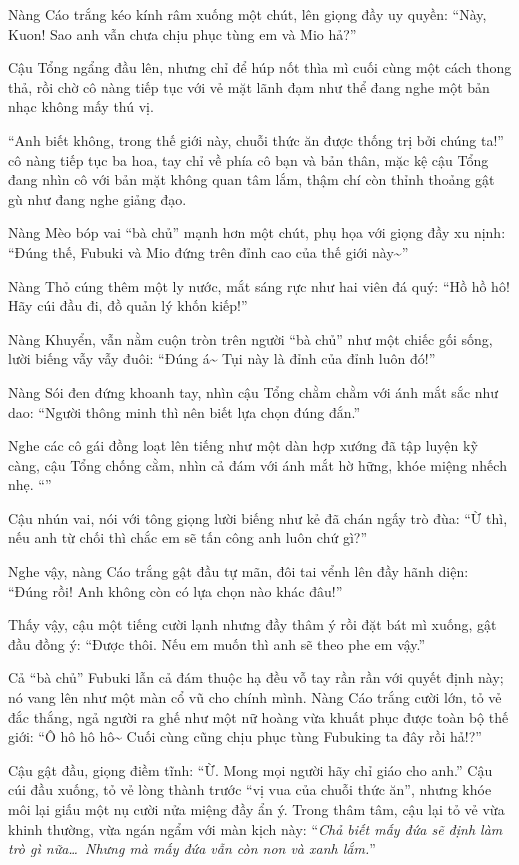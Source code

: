\documentclass[../main.tex]{subfiles}
\begin{document}

Nàng Cáo trắng kéo kính râm xuống một chút, lên giọng đầy uy quyền: ``Này, Kuon! Sao anh vẫn chưa chịu phục tùng em và Mio hả?''

Cậu Tổng ngẩng đầu lên, nhưng chỉ để húp nốt thìa mì cuối cùng một cách thong thả, rồi chờ cô nàng tiếp tục với vẻ mặt lãnh đạm như thể đang nghe một bản nhạc không mấy thú vị.

``Anh biết không, trong thế giới này, chuỗi thức ăn được thống trị bởi chúng ta!'' cô nàng tiếp tục ba hoa, tay chỉ về phía cô bạn và bản thân, mặc kệ cậu Tổng đang nhìn cô với bản mặt không quan tâm lắm, thậm chí còn thỉnh thoảng gật gù như đang nghe giảng đạo.

Nàng Mèo bóp vai ``bà chủ'' mạnh hơn một chút, phụ họa với giọng đầy xu nịnh: ``Đúng thế, Fubuki và Mio đứng trên đỉnh cao của thế giới này\~{}''

Nàng Thỏ cúng thêm một ly nước, mắt sáng rực như hai viên đá quý: ``Hồ hồ hô! Hãy cúi đầu đi, đồ quản lý khốn kiếp!''

Nàng Khuyển, vẫn nằm cuộn tròn trên người ``bà chủ'' như một chiếc gối sống, lười biếng vẫy vẫy đuôi: ``Đúng á\~{} Tụi này là đỉnh của đỉnh luôn đó!''

Nàng Sói đen đứng khoanh tay, nhìn cậu Tổng chằm chằm với ánh mắt sắc như dao: ``Người thông minh thì nên biết lựa chọn đúng đắn.''

Nghe các cô gái đồng loạt lên tiếng như một dàn hợp xướng đã tập luyện kỹ càng, cậu Tổng chống cằm, nhìn cả đám với ánh mắt hờ hững, khóe miệng nhếch nhẹ. ``\textit{}''

Cậu nhún vai, nói với tông giọng lười biếng như kẻ đã chán ngấy trò đùa: ``Ừ thì, nếu anh từ chối thì chắc em sẽ tấn công anh luôn chứ gì?''

Nghe vậy, nàng Cáo trắng gật đầu tự mãn, đôi tai vểnh lên đầy hãnh diện: ``Đúng rồi! Anh không còn có lựa chọn nào khác đâu!''

Thấy vậy, cậu một tiếng cười lạnh nhưng đầy thâm ý rồi đặt bát mì xuống, gật đầu đồng ý: ``Được thôi. Nếu em muốn thì anh sẽ theo phe em vậy.''

Cả ``bà chủ'' Fubuki lẫn cả đám thuộc hạ đều vỗ tay rần rần với quyết định này; nó vang lên như một màn cổ vũ cho chính mình. Nàng Cáo trắng cười lớn, tỏ vẻ đắc thắng, ngả người ra ghế như một nữ hoàng vừa khuất phục được toàn bộ thế giới: ``Ô hô hô hô\~{} Cuối cùng cũng chịu phục tùng Fubuking ta đây rồi hả!?''

Cậu gật đầu, giọng điềm tĩnh: ``Ừ. Mong mọi người hãy chỉ giáo cho anh.'' Cậu cúi đầu xuống, tỏ vẻ lòng thành trước ``vị vua của chuỗi thức ăn'', nhưng khóe môi lại giấu một nụ cười nửa miệng đầy ẩn ý. Trong thâm tâm, cậu lại tỏ vẻ vừa khinh thường, vừa ngán ngẩm với màn kịch này: ``\textit{Chả biết mấy đứa sẽ định làm trò gì nữa\dots\ Nhưng mà mấy đứa vẫn còn non và xanh lắm.}''
\end{document}
